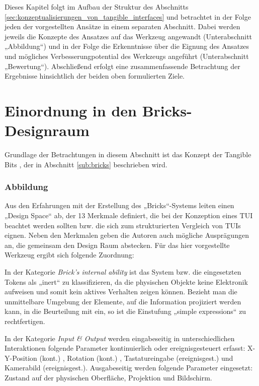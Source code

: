 Dieses Kapitel folgt im Aufbau der Struktur des Abschnitts \ref{sec:konzeptualisierungen_von_tangible_interfaces} und betrachtet in der Folge jeden der vorgestellten Ansätze in einem separaten Abschnitt. Dabei werden jeweils die Konzepte des Ansatzes auf das Werkzeug angewandt (Unterabschnitt „Abbildung“) und in der Folge die Erkenntnisse über die Eignung des Ansatzes und mögliches Verbesserungpotential des Werkzeugs angeführt (Unterabschnitt „Bewertung“). Abschließend erfolgt eine zusammenfassende Betrachtung der Ergebnisse hinsichtlich der beiden oben formulierten Ziele.

\section{Einordnung in den Bricks-Designraum} %
\label{sec:einordnung_in_den_bricks_designraum}

Grundlage der Betrachtungen in diesem Abschnitt ist das Konzept der Tangible Bits \citep{Fitzmaurice95}, der in Abschnitt \ref{sub:bricks} beschrieben wird.

\subsubsection{Abbildung} 

Aus den Erfahrungen mit der Erstellung des „Bricks“-Systems leiten \citet{Fitzmaurice95} einen  „Design Space“ ab, der 13 Merkmale definiert, die bei der Konzeption eines \gls{TUI} beachtet werden sollten bzw. die sich zum strukturierten Vergleich von \glspl{TUI} eignen. Neben den Merkmalen geben die Autoren auch mögliche Ausprägungen an, die gemeinsam den Design Raum abstecken. Für das hier vorgestellte Werkzeug ergibt sich folgende Zuordnung:

In der Kategorie \emph{Brick's internal ability} ist das System bzw. die eingesetzten Tokens als „inert“ zu klassifizieren, da die physischen Objekte keine Elektronik aufweisen und somit kein aktives Verhalten zeigen können. Bezieht man die unmittelbare Umgebung der Elemente, auf die Information projiziert werden kann, in die Beurteilung mit ein, so ist die Einstufung „simple expressions“ zu rechtfertigen. 

In der Kategorie \emph{Input \& Output} werden eingabeseitig in unterschiedlichen Interaktionen folgende Parameter kontinuierlich oder ereignisgesteuert erfasst: X-Y-Position (kont.) , Rotation (kont.) , Tastatureingabe (ereignisgest.) und Kamerabild (ereignisgest.). Ausgabeseitig werden folgende Parameter eingesetzt: Zustand auf der physischen Oberfläche, Projektion und Bildschirm.


